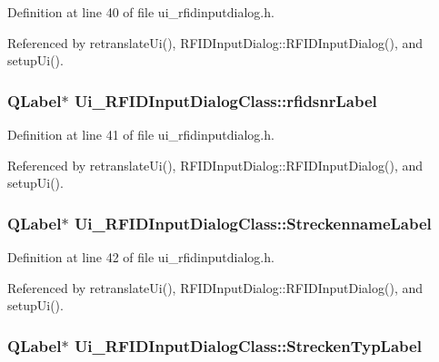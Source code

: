 Definition at line 40 of file ui\_\-rfidinputdialog.h.

Referenced by retranslateUi(), RFIDInputDialog::RFIDInputDialog(), and setupUi().\hypertarget{class_ui___r_f_i_d_input_dialog_class_e1cf828e7765fc2de4958f12a5f20457}{
\subsubsection[rfidsnrLabel]{\setlength{\rightskip}{0pt plus 5cm}QLabel$\ast$ {\bf Ui\_\-RFIDInputDialogClass::rfidsnrLabel}}}
\label{class_ui___r_f_i_d_input_dialog_class_e1cf828e7765fc2de4958f12a5f20457}




Definition at line 41 of file ui\_\-rfidinputdialog.h.

Referenced by retranslateUi(), RFIDInputDialog::RFIDInputDialog(), and setupUi().\hypertarget{class_ui___r_f_i_d_input_dialog_class_7b713247b88918a9e24f92b810e1c9d2}{
\subsubsection[StreckennameLabel]{\setlength{\rightskip}{0pt plus 5cm}QLabel$\ast$ {\bf Ui\_\-RFIDInputDialogClass::StreckennameLabel}}}
\label{class_ui___r_f_i_d_input_dialog_class_7b713247b88918a9e24f92b810e1c9d2}




Definition at line 42 of file ui\_\-rfidinputdialog.h.

Referenced by retranslateUi(), RFIDInputDialog::RFIDInputDialog(), and setupUi().\hypertarget{class_ui___r_f_i_d_input_dialog_class_1272a976363682dd34399d74b1fbd968}{
\subsubsection[StreckenTypLabel]{\setlength{\rightskip}{0pt plus 5cm}QLabel$\ast$ {\bf Ui\_\-RFIDInputDialogClass::StreckenTypLabel}}}
\label{class_ui___r_f_i_d_input_dialog_class_1272a976363682dd34399d74b1fbd968}




